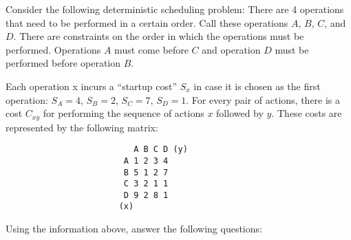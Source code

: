 \documentclass[11pts]{article}
\begin{document}
\maketitle



Consider the following deterministic scheduling problem: There are 4 operations
that need to be performed in a certain order. Call these operations $A$, $B$,
$C$, and $D$. There are constraints on the order in which the operations must be
performed. Operations $A$ must come before $C$ and operation $D$ must
be performed before operation $B$.

Each operation x incurs a “startup cost” $S_{x}$ in case it is chosen as the
first operation: $S_{A} = 4$, $S_{B} = 2$, $S_{C} = 7$, $S_{D} = 1$.
For every pair of
actions, there is a cost $C_{xy}$ for performing the sequence of actions $x$
followed by $y$. These costs are represented by the following matrix:

\begin{verbatim}
                          A B C D (y)
                        A 1 2 3 4
                        B 5 1 2 7
                        C 3 2 1 1
                        D 9 2 8 1
                       (x)
\end{verbatim}

Using the information above, answer the following questions:
\end{document}
